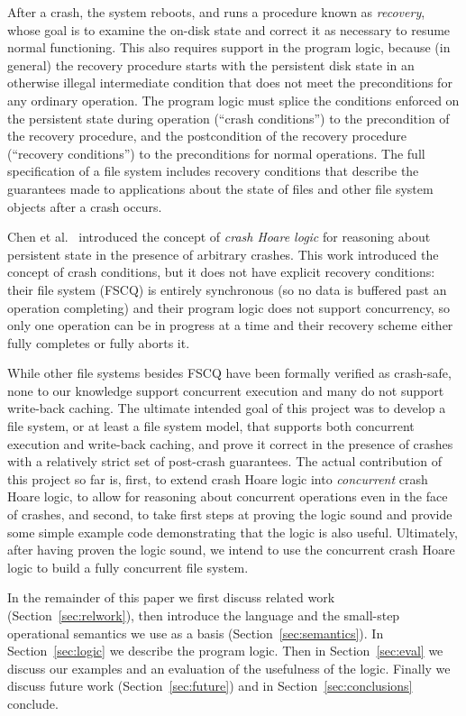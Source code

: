 After a crash, the system reboots, and runs a procedure
known as \emph{recovery}, whose goal is to examine the on-disk state
and correct it as necessary to resume normal functioning.
This also requires support in the program logic, because (in general)
the recovery procedure starts with the persistent disk state in an
otherwise illegal intermediate condition that does not meet the
preconditions for any ordinary operation.
The program logic must splice the conditions enforced on the
persistent state during operation (``crash conditions'') to the
precondition of the recovery procedure, and the postcondition of the
recovery procedure (``recovery conditions'') to the preconditions for
normal operations.
The full specification of a file system includes recovery conditions
that describe the guarantees made to applications about the state of
files and other file system objects after a crash occurs.

Chen et al.~\cite{chen2015using} introduced the concept of \emph{crash
Hoare logic} for reasoning about persistent state in the presence of
arbitrary crashes.
This work introduced the concept of crash conditions, but it does not
have explicit recovery conditions: their file system (FSCQ) is
entirely synchronous (so no data is buffered past an operation
completing) and their program logic does not support concurrency, so
only one operation can be in progress at a time and their recovery
scheme either fully completes or fully aborts it.

While other file systems besides FSCQ have been formally verified as
crash-safe, none to our knowledge support concurrent execution and
many do not support write-back caching.
The ultimate intended goal of this project was to develop a file
system, or at least a file system model, that supports both concurrent
execution and write-back caching, and prove it correct in the presence
of crashes with a relatively strict set of post-crash guarantees.
The actual contribution of this project so far is, first, to extend
crash Hoare logic into \emph{concurrent} crash Hoare logic, to allow
for reasoning about concurrent operations even in the face of crashes,
and second, to take first steps at proving the
logic sound and provide some simple example code demonstrating that
the logic is also useful.
Ultimately, after having proven the logic sound, we intend to use the
concurrent crash Hoare logic to build a fully concurrent file system.

In the remainder of this paper we first discuss related work
(Section~\ref{sec:relwork}), then introduce the language and the
small-step operational semantics we use as a basis (Section~\ref{sec:semantics}).
In Section~\ref{sec:logic} we describe the program logic.
Then in Section~\ref{sec:eval} we discuss our examples and an
evaluation of the usefulness of the logic.
Finally we discuss future work (Section~\ref{sec:future}) and in
Section~\ref{sec:conclusions} conclude.

